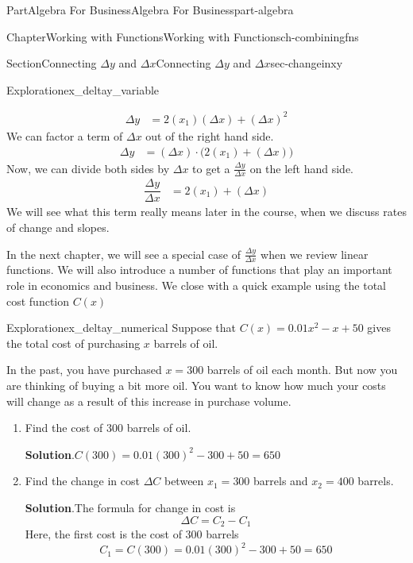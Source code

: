 \documentclass{tufte-book}
\newcommand{\blocktitlefont}{\relax}
\numberwithin{equation}{chapter}
\newcommand{\amp}{&}
\begin{document}
\begin{partptx}{Part}{Algebra For Business}{}{Algebra For Business}{}{}{part-algebra}
\begin{chapterptx}{Chapter}{Working with Functions}{}{Working with Functions}{}{}{ch-combiningfns}
\begin{sectionptx}{Section}{\textasteriskcentered{}Connecting \(\Delta y\) and \(\Delta x\)}{}{\textasteriskcentered{}Connecting \(\Delta y\) and \(\Delta x\)}{}{}{sec-changeinxy}
\begin{exploration}{Exploration}{}{ex_deltay_variable}
\begin{enumerate}[font=\bfseries,label=(\alph*),ref=\alph*]
\begin{align*}
\Delta y \amp = 2(x_1)(\Delta x)+(\Delta x)^2
\end{align*}
We can factor a term of \(\Delta x\) out of the right hand side.%
\begin{align*}
\Delta y \amp = (\Delta x)\cdot \Big(2(x_1)+(\Delta x)\Big)
\end{align*}
Now, we can divide both sides by \(\Delta x\) to get a \(\frac{\Delta y}{\Delta x}\) on the left hand side.%
\begin{align*}
\dfrac{\Delta y}{\Delta x} \amp =  2(x_1)+(\Delta x)
\end{align*}
We will see what this term really means later in the course, when we discuss rates of change and slopes.%
\end{enumerate}%
\end{exploration}%
In the next chapter, we will see a special case of \(\frac{\Delta y}{\Delta x}\) when we review linear functions.  We will also introduce a number of functions that play an important role in economics and business. We close with a quick example using the total cost function \(C(x)\)%
\begin{exploration}{Exploration}{}{ex_deltay_numerical}%
Suppose that \(C(x)= 0.01 x^2 - x+ 50\) gives the total cost of purchasing \(x\) barrels of oil.%
\par
In the past, you have purchased \(x=300\) barrels of oil each month. But now you are thinking of buying a bit more oil.  You want to know how much your costs will change as a result of this increase in purchase volume.%
\begin{enumerate}[font=\bfseries,label=(\alph*),ref=\alph*]%
\item{}Find the cost of \(300\) barrels of oil.%
\par\smallskip%
\noindent\textbf{\blocktitlefont Solution}.\hypertarget{ex_deltay_numerical-2-2}{}\quad{}\(C(300) = 0.01(300)^2 - 300 + 50 = 650\)%
\item{}Find the change in cost \(\Delta C\) between \(x_1=300\) barrels and \(x_2=400\) barrels.%
\par\smallskip%
\noindent\textbf{\blocktitlefont Solution}.\hypertarget{ex_deltay_numerical-3-2}{}\quad{}The formula for change in cost is%
\begin{equation*}
\Delta C = C_2 - C_1
\end{equation*}
Here, the first cost is the cost of 300 barrels%
\begin{equation*}
C_1 = C(300) = 0.01(300)^2 - 300 + 50 = 650

\end{equation*}
\end{enumerate}
\end{exploration}
\end{sectionptx}
\end{chapterptx}
\end{partptx}
\end{document}
